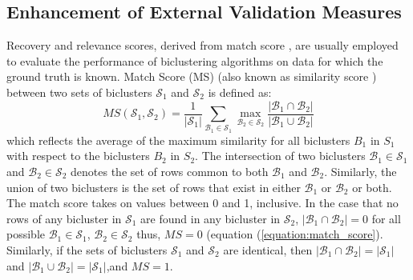 
\subsection{Enhancement of External Validation Measures}

Recovery and relevance scores, derived from  match score \cite{prelic2006systematic}, are usually employed to evaluate the performance of biclustering algorithms on data for which the ground truth is known.
Match Score (MS) (also known as similarity score \cite{wang2016unibic}) between two sets of biclusters $\mathcal{S}_1$ and $\mathcal{S}_2$  is defined as:
\begin{equation} \label{equation:match_score}
	MS\left(\mathcal{S}_1, \mathcal{S}_2\right) =
    	\frac{1}{\lvert \mathcal{S}_1 \rvert} \sum_{\mathcal{B}_1 \in \mathcal{S}_1} \max_{\mathcal{B}_2 \in \mathcal{S}_2} \frac{\lvert \mathcal{B}_1 \cap \mathcal{B}_2 \rvert}{\lvert \mathcal{B}_1 \cup \mathcal{B}_2 \rvert}
\end{equation}
which reflects the average of the maximum similarity for all
biclusters $B_1$ in $S_1$ with respect to the biclusters $B_2$ in $S_2$. The intersection of two biclusters $\mathcal{B}_1 \in \mathcal{S}_1$ and $\mathcal{B}_2 \in \mathcal{S}_2$ denotes the set of rows common to both $\mathcal{B}_1$ and $\mathcal{B}_2$. Similarly, the union of two biclusters is the set of rows that exist in either $\mathcal{B}_1$ or $\mathcal{B}_2$ or both.
The match score takes on values between 0 and 1, inclusive. In the case that no rows of any bicluster in $\mathcal{S}_1$ are found in any bicluster in $\mathcal{S}_2$, $\lvert \mathcal{B}_1 \cap \mathcal{B}_2 \rvert = 0$ for all possible $\mathcal{B}_1 \in \mathcal{S}_1$, $\mathcal{B}_2 \in \mathcal{S}_2$ thus, $MS = 0$ (equation (\ref{equation:match_score}). Similarly, if the sets of biclusters $\mathcal{S}_1$ and $\mathcal{S}_2$ are identical, then $\lvert \mathcal{B}_1 \cap \mathcal{B}_2 \rvert = \lvert \mathcal{S}_1 \rvert$ and $\lvert \mathcal{B}_1 \cup \mathcal{B}_2 \rvert = \lvert \mathcal{S}_1 \rvert$,and $MS = 1$. 

